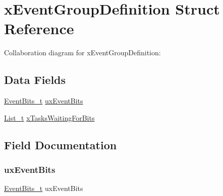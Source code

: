 \hypertarget{structx_event_group_definition}{}\section{x\+Event\+Group\+Definition Struct Reference}
\label{structx_event_group_definition}


Collaboration diagram for x\+Event\+Group\+Definition\+:
\subsection*{Data Fields}
\begin{DoxyCompactItemize}
\item 
\hyperlink{event__groups_8h_ab2f21b93db0b2a0ab64d7a81ff32ac2e}{Event\+Bits\+\_\+t} \hyperlink{structx_event_group_definition_a518ab52c1060afbc5ca27d6d904be9e1}{ux\+Event\+Bits}
\item 
\hyperlink{list_8h_afd590ef6400071b4d63d65ef90bea7f4}{List\+\_\+t} \hyperlink{structx_event_group_definition_a3cad6f30679ed2f331cdcac8e0698525}{x\+Tasks\+Waiting\+For\+Bits}
\end{DoxyCompactItemize}


\subsection{Field Documentation}
\mbox{\label{structx_event_group_definition_a518ab52c1060afbc5ca27d6d904be9e1}} 
\subsubsection{\texorpdfstring{ux\+Event\+Bits}{uxEventBits}}
{\footnotesize\ttfamily \hyperlink{event__groups_8h_ab2f21b93db0b2a0ab64d7a81ff32ac2e}{Event\+Bits\+\_\+t} ux\+Event\+Bits}

\mbox{\label{structx_event_group_definition_a3cad6f30679ed2f331cdcac8e0698525}} 

